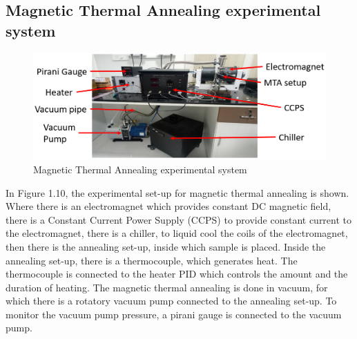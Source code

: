 \documentclass[12pt,a4paper,bold]{thesis}
\theoremstyle{thm}
\theoremstyle{definition}
\begin{document}
\subsection{Magnetic Thermal Annealing experimental system}
\begin{figure}[H]
	\centering
   \includegraphics[scale=0.56]{Images/27.png} 
   \caption{Magnetic Thermal Annealing experimental system}
\end{figure}
In Figure 1.10, the experimental set-up for magnetic thermal annealing is shown. Where there is an electromagnet which provides constant DC magnetic field, there is a Constant Current Power Supply (CCPS) to provide constant current to the electromagnet, there is a chiller, to liquid cool the coils of the electromagnet, then there is the annealing set-up, inside which sample is placed. Inside the annealing set-up, there is a thermocouple, which generates heat. The thermocouple is connected to the heater PID which controls the amount and the duration of heating. The magnetic thermal annealing is done in vacuum, for which there is a rotatory vacuum pump connected to the annealing set-up. To monitor the vacuum pump pressure, a pirani gauge is connected to the vacuum pump.    
\end{document}
